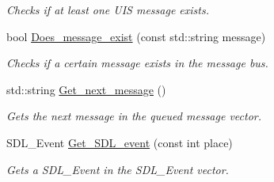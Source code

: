 \begin{DoxyCompactItemize}
\begin{DoxyCompactList}\small\item\em Checks if at least one U\+IS message exists. \end{DoxyCompactList}\item 
bool \hyperlink{classjetfuel_1_1core_1_1Message__bus_a9bbbbea3cd97a8f8253e08b700dbd05d}{Does\+\_\+message\+\_\+exist} (const std\+::string message)
\begin{DoxyCompactList}\small\item\em Checks if a certain message exists in the message bus. \end{DoxyCompactList}\item 
std\+::string \hyperlink{classjetfuel_1_1core_1_1Message__bus_ae79fcd8945a1d72bbebc838be6d23a1f}{Get\+\_\+next\+\_\+message} ()
\begin{DoxyCompactList}\small\item\em Gets the next message in the queued message vector. \end{DoxyCompactList}\item 
S\+D\+L\+\_\+\+Event \hyperlink{classjetfuel_1_1core_1_1Message__bus_ab80c8b51aca00ad4942ee2114fdf2fec}{Get\+\_\+\+S\+D\+L\+\_\+event} (const int place)
\begin{DoxyCompactList}\small\item\em Gets a S\+D\+L\+\_\+\+Event in the S\+D\+L\+\_\+\+Event vector. \end{DoxyCompactList}\end{DoxyCompactItemize}
